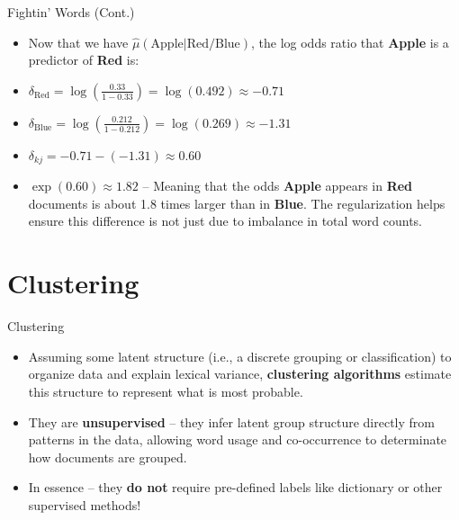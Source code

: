 \documentclass[
  ignorenonframetext,
  aspectratio=169]{beamer}
\begin{document}
\begin{frame}{Fightin' Words (Cont.)}
\label{fightin-words-cont.}
\begin{itemize}
\item Now that we have $\hat{\mu}(\text{Apple}|\text{Red/Blue})$, the log odds ratio that \textbf{Apple} is a predictor of \textbf{Red} is: \par \vspace{2.5mm} \pause

\item $\delta_{\text{Red}} = \log\left(\frac{0.33}{1-0.33}\right) = \log(0.492) \approx -0.71$ \par \vspace{2.5mm}

\item $\delta_{\text{Blue}} = \log\left(\frac{0.212}{1-0.212}\right) = \log(0.269) \approx -1.31$ \par \vspace{2.5mm}

\item $\delta_{kj} = -0.71 - (-1.31) \approx 0.60$ \pause \par \vspace{2.5mm}

\item $\exp(0.60) \approx 1.82$ -- Meaning that the odds \textbf{Apple} appears in \textbf{Red} documents is about 1.8 times larger than in \textbf{Blue}. The regularization helps ensure this difference is not just due to imbalance in total word counts.
\end{itemize}
\end{frame}

\section{Clustering}\label{clustering}

\begin{frame}{Clustering}
\label{clustering-1}
\begin{itemize}
\item Assuming some latent structure (i.e., a discrete grouping or classification) to organize data and explain lexical variance, \textbf{clustering algorithms} estimate this structure to represent what is most probable. \par \vspace{2.5mm} \pause
\item They are \textbf{unsupervised} -- they infer latent group structure directly from patterns in the data, allowing word usage and co-occurrence to determinate how documents are grouped. \par \vspace{2.5mm} 
\item In essence -- they \textbf{do not} require pre-defined labels like dictionary or other supervised methods! 
\end{itemize}
\end{frame}
\end{document}
